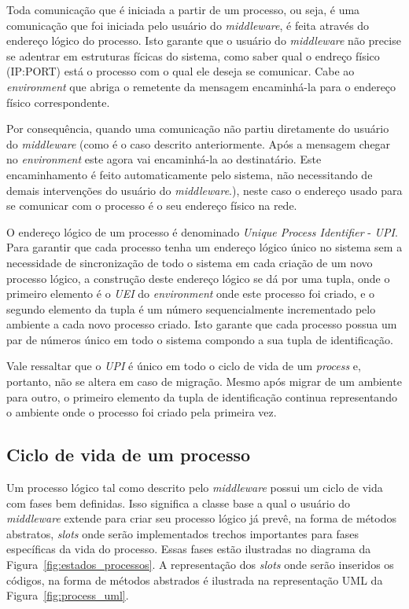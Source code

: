 Toda comunicação que é iniciada a partir de um processo, ou seja, é uma comunicação que foi iniciada pelo usuário do \textit{middleware}, é feita através do endereço lógico do processo. Isto garante que o usuário do \textit{middleware} não precise se adentrar em estruturas fícicas do sistema, como saber qual o endreço físico (IP:PORT) está o processo com o qual ele deseja se comunicar. Cabe ao \textit{environment} que abriga o remetente da mensagem encaminhá-la para o endereço físico correspondente.

Por consequência, quando uma comunicação não partiu diretamente do usuário do \textit{middleware} (como é o caso descrito anteriormente. Após a mensagem chegar no \textit{environment} este agora vai encaminhá-la ao destinatário. Este encaminhamento é feito automaticamente pelo sistema, não necessitando de demais intervenções do usuário do \textit{middleware}.), neste caso o endereço usado para se comunicar com o processo é o seu endereço físico na rede.

O endereço lógico de um processo é denominado \textit{Unique Process Identifier} - \textit{UPI}. Para garantir que cada processo tenha um endereço lógico único no sistema sem a necessidade de sincronização de todo o sistema em cada criação de um novo processo lógico, a construção deste endereço lógico se dá por uma tupla, onde o primeiro elemento é o \textit{UEI} do \textit{environment} onde este processo foi criado, e o segundo elemento da tupla é um número sequencialmente incrementado pelo ambiente a cada novo processo criado. Isto garante que cada processo possua um par de números único em todo o sistema compondo a sua tupla de identificação.

Vale ressaltar que o \textit{UPI} é único em todo o ciclo de vida de um \textit{process} e, portanto, não se altera em caso de migração. Mesmo após migrar de um ambiente para outro, o primeiro elemento da tupla de identificação continua representando o ambiente onde o processo foi criado pela primeira vez.

\subsection{Ciclo de vida de um processo}

Um processo lógico tal como descrito pelo \textit{middleware} possui um ciclo de vida com fases bem definidas. Isso significa a classe base a qual o usuário do \textit{middleware} extende para criar seu processo lógico já prevê, na forma de métodos abstratos, \textit{slots} onde serão implementados trechos importantes para fases específicas da vida do processo. Essas fases estão ilustradas no diagrama da Figura~\ref{fig:estados_processos}. A representação dos \textit{slots} onde serão inseridos os códigos, na forma de métodos abstrados é ilustrada na representação UML da Figura~\ref{fig:process_uml}.

